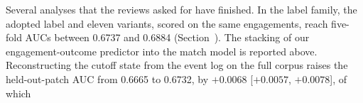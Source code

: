 Several analyses that the reviews asked for have finished. In the label family, the adopted label and
eleven variants, scored on the same engagements, reach five-fold AUCs between 0.6737 and 0.6884
(Section~). The stacking of our engagement-outcome predictor into the match
model is reported above. Reconstructing the cutoff state from the event log on the full corpus raises
the held-out-patch AUC from 0.6665 to 0.6732, by $+0.0068$ [$+0.0057$, $+0.0078$], of which
